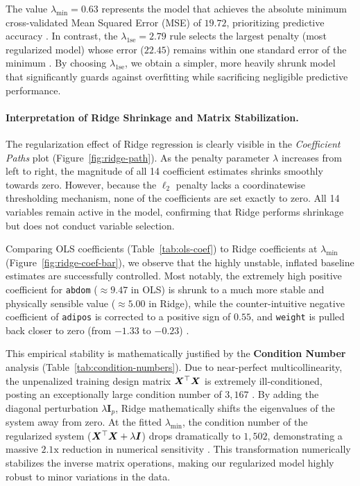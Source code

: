 

The value $\lambda_{\min} = 0.63$ represents the model that achieves the absolute minimum cross-validated Mean Squared Error (MSE) of $19.72$, prioritizing predictive accuracy \cite{127}. In contrast, the $\lambda_{1\mathrm{se}} = 2.79$ rule selects the largest penalty (most regularized model) whose error ($22.45$) remains within one standard error of the minimum \cite{127}. By choosing $\lambda_{1\mathrm{se}}$, we obtain a simpler, more heavily shrunk model that significantly guards against overfitting while sacrificing negligible predictive performance.

\begin{table}[H]
\centering
\caption{Condition number of $\bX^\top\bX$ vs.\ $\bX^\top\bX + \lambda\bm{I}$ for selected $\lambda$ values.}
\label{tab:condition-numbers}

\end{table}

\paragraph{Interpretation of Ridge Shrinkage and Matrix Stabilization.}
The regularization effect of Ridge regression is clearly visible in the \textit{Coefficient Paths} plot (Figure~\ref{fig:ridge-path}). As the penalty parameter $\lambda$ increases from left to right, the magnitude of all 14 coefficient estimates shrinks smoothly towards zero. However, because the $\ell_2$ penalty lacks a coordinatewise thresholding mechanism, none of the coefficients are set exactly to zero. All 14 variables remain active in the model, confirming that Ridge performs shrinkage but does not conduct variable selection.

Comparing OLS coefficients (Table~\ref{tab:ols-coef}) to Ridge coefficients at $\lambda_{\min}$ (Figure~\ref{fig:ridge-coef-bar}), we observe that the highly unstable, inflated baseline estimates are successfully controlled. Most notably, the extremely high positive coefficient for \texttt{abdom} ($\approx 9.47$ in OLS) is shrunk to a much more stable and physically sensible value ($\approx 5.00$ in Ridge), while the counter-intuitive negative coefficient of \texttt{adipos} is corrected to a positive sign of $0.55$, and \texttt{weight} is pulled back closer to zero (from $-1.33$ to $-0.23$) \cite{123, 125}.

This empirical stability is mathematically justified by the \textbf{Condition Number} analysis (Table~\ref{tab:condition-numbers}). Due to near-perfect multicollinearity, the unpenalized training design matrix $\bX^\top\bX$ is extremely ill-conditioned, posting an exceptionally large condition number of $3,167$ \cite{122}. By adding the diagonal perturbation $\lambda \bm{I}_p$, Ridge mathematically shifts the eigenvalues of the system away from zero. At the fitted $\lambda_{\min}$, the condition number of the regularized system ($\bX^\top\bX + \lambda\bm{I}$) drops dramatically to $1,502$, demonstrating a massive $2.1\text{x}$ reduction in numerical sensitivity \cite{122}. This transformation numerically stabilizes the inverse matrix operations, making our regularized model highly robust to minor variations in the data.

